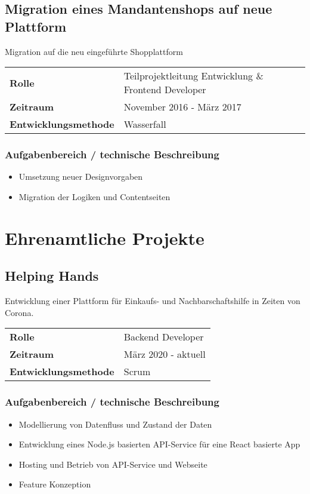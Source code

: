 \documentclass[10pt,ngerman,a4paper]{article}
\begin{document}
\subsection{Migration eines Mandantenshops auf neue Plattform}
Migration auf die neu eingeführte Shopplattform

\begin{tabular}{ll}
\textbf{Rolle} & Teilprojektleitung Entwicklung \& Frontend Developer \\
\textbf{Zeitraum} & November 2016 - März 2017\\
\textbf{Entwicklungsmethode} & Wasserfall
\end{tabular}

\subsubsection{Aufgabenbereich / technische Beschreibung}
\begin{itemize}
\item Umsetzung neuer Designvorgaben
\item Migration der Logiken und Contentseiten
\end{itemize}

\section{Ehrenamtliche Projekte}
\subsection{Helping Hands}
Entwicklung einer Plattform für Einkaufs- und Nachbarschaftshilfe in Zeiten von Corona.

\begin{tabular}{ll}
\textbf{Rolle} & Backend Developer \\
\textbf{Zeitraum} & März 2020 - aktuell\\
\textbf{Entwicklungsmethode} & Scrum
\end{tabular}

\subsubsection{Aufgabenbereich / technische Beschreibung}
\begin{itemize}
\item Modellierung von Datenfluss und Zustand der Daten
\item Entwicklung eines Node.js basierten API-Service für eine React basierte App
\item Hosting und Betrieb von API-Service und Webseite
\item Feature Konzeption
\end{itemize}


\end{document}
